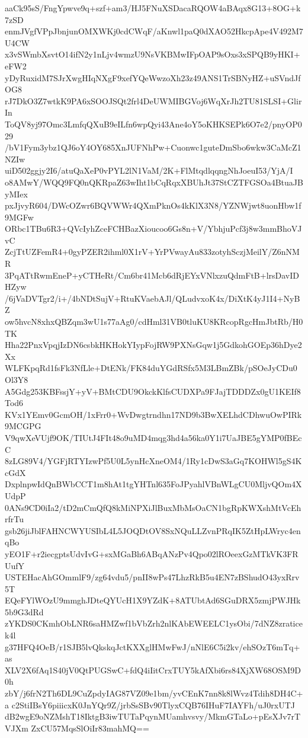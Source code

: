 aaCk95sS/FngYpwve9q+szf+am3/HJ5FNuXSDacaRQOW4aBAqx8G13+8OG+k7zSD
enmJVgfVPpJbnjunOMXWKj0cdCWqF/aKnwl1paQ0dXAO52HkcpApe4V492M7U4CW
x3vSWmbXsvtO14ifN2y1nLjv4wmzU9NsVKBMwIFpOAP9sOxs3xSPQB9yHKI+eFW2
yDyRuxidM7SJrXwgHIqNXgF9xefYQeWwzoXh23z49ANS1TrSBNyHZ+uSVndJfOG8
rJ7DkO3Z7wtkK9PA6xSOOJSQt2frl4DeUWMIBGVoj6WqXrJh2TU81SLSI+GlirIn
ToQV8yj97Omc3LmfqQXuB9eILfn6wpQyi43Ane4oY5oKHKSEPk6O7e2/pnyOP029
/bV1Fym3ybz1QJ6oY4OY685XnJUFNhPw+Cuonwc1guteDmSbo6wkw3CaMcZ1NZIw
uiD502ggjy2I6/atuQaXeP0vPYL2lN1VaM/2K+FlMtqdlqqngNhJoeuI53/YjA/I
o8AMwY/WQQ9FQ0nQKRpaZ63wIht1bCqRqxXBUhJt37StCZTFGSOa4BtuaJByMIex
pxJjvyR604/DWcOZwr6BQVWWr4QXmPknOs4kKlX3N8/YZNWjwt8uonHbw1f9MGFw
ORbc1TBu6R3+QVcIyhZceFCHBazXioucoo6Gs8n+V/YbhjuPcf3j8w3mmBhoVJvC
ZcjTtUZFemR4+0gyPZER2ihml0X1rV+YrPVwayAu833zotyhSczjMeilY/Z6nNMR
3PqATtRwmEneP+yCTHeRt/Cm6br41Mcb6dRjEYxVNlxzuQdmFtB+lrsDavIDHZyw
/6jVaDVTgr2/i+/4bNDtSujV+RtuKVaebAJl/QLudvxoK4x/DiXtK4yJ1I4+NyBZ
ow5hvcN8xhxQBZqm3wU1s77aAg0/cdHml31VB0tluKU8KRcopRgcHmJbtRb/H0TK
Hha22PnxVpqjIzDN6csbkHKHokYIypFojRW9PXNsGqw1j5GdkohGOEp36hDye2Xx
WLFKpqRd1fsFk3NfLle+DtENk/FK84duYGdRSfx5M3LBmZBk/pSOeJyCDu0Ol3Y8
A5Gdg253KBFssjY+yV+BMtCDU9OkckKlfsCUDXPa9FJajTDDDZx0gU1KEIf8Tod6
KVx1YEmv0GcmOH/1xFrr0+WvDwgtrndhn17ND9b3BwXELhdCDhwuOwPIRk9MCGPG
V9qwXeVUjf9OK/TIUtJ4FIt48o9uMD4mqg3hd4a56ka0Y1i7UaJBE5gYMP0fBEcC
8zLG89V4/YGFjRTYIzwPf5U0L5ynHcXneOM4/1Ry1cDwS3aGq7KOHWl5gS4KcGdX
DxplnpwIdQnBWbCCT1m8hAt1tgYHTnl635FoJPyahlVBnWLgCU0MljvQOm4XUdpP
0ANs9CD0iIa2/tD2mCmQfQ8kMiNPXiJlBuxMbMsOaCN1bgRpKWXshMtVcEhrfrTu
gsb26jiJblFAHNCWYUSIbL4L5JOQDtOV8SxNQuLLZvnPRqIK5ZtHpLWryc4enqBo
yEO1F+r2iecgptsUdvIvG+sxMGaBh6ABqANzPv4Qpo02lROeexGzMTkVK3FRUufY
USTEHacAhGOmmlF9/zg64vdu5/pnII8wPs47LhzRkB5u4EN7zBShudO43yxRrv5T
EQeFYlWOzU9mmghJDteQYUcH1X9YZdK+8ATUbtAd6SGuDRX5zmjPWJHk5b9G3dRd
zYKDS0CKmhObLNR6saHMZwf1bVbZrh2nlKAbEWEELC1ysObi/7dNZ8zraticek4l
g37HFQ4OeB/r1SJB5lvQkskqJctKXXglHMwFwJ/nNlE6C5i2kv/ehSOzT6mTq+as
XLV2X6fAq1S40jV0QtPUGSwC+fdQ4iIitCrxTUY5kAfXbi6rs84XjXW68OSM9D0h
zbY/j6frN2Th6DL9CuZpdyIAG87VZ09e1bm/yvCEnK7nn8k8lWvz4Tdih8DH4C+a
c2StiIBsY6piiicxK0JnYQr9Z/jrbSsSBv90TlyxCQB76IHuF7IAYFh/uJ0rxUTJ
dB2wgE9oNZMshT18IktgB3iwTUTaPqynMUamhvsvy/MkmGTaLo+pEsXJv7rTVJXm
ZxCU57MqsSlOiIr83mahMQ==
